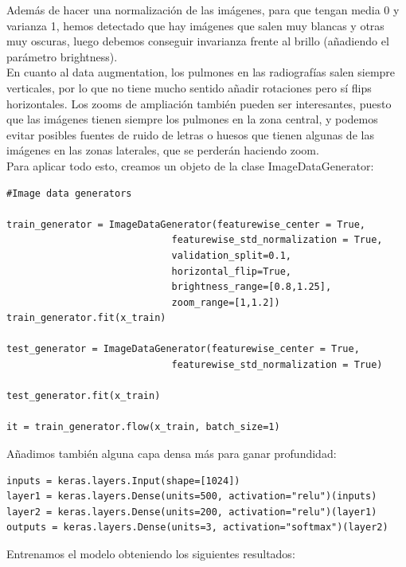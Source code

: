 \documentclass[11pt,a4paper]{article}
\theoremstyle{definition}
\begin{document}
Además de hacer una normalización de las imágenes, para que tengan media 0 y varianza 1, hemos detectado que hay imágenes que salen muy blancas y otras muy oscuras, luego debemos conseguir invarianza frente al brillo (añadiendo el parámetro brightness).\\

En cuanto al data augmentation, los pulmones en las radiografías salen siempre verticales, por lo que no tiene mucho sentido añadir rotaciones pero sí flips horizontales. Los zooms de ampliación también pueden ser interesantes, puesto que las imágenes tienen siempre los pulmones en la zona central, y podemos evitar posibles fuentes de ruido de letras o huesos que tienen algunas de las imágenes en las zonas laterales, que se perderán haciendo zoom.\\

Para aplicar todo esto, creamos un objeto de la clase ImageDataGenerator:

\begin{lstlisting}
#Image data generators

train_generator = ImageDataGenerator(featurewise_center = True,
                             featurewise_std_normalization = True,
                             validation_split=0.1,
                             horizontal_flip=True,
                             brightness_range=[0.8,1.25],
                             zoom_range=[1,1.2])
train_generator.fit(x_train)

test_generator = ImageDataGenerator(featurewise_center = True,
                             featurewise_std_normalization = True)

test_generator.fit(x_train)

it = train_generator.flow(x_train, batch_size=1)
\end{lstlisting}

Añadimos también alguna capa densa más para ganar profundidad:

\begin{lstlisting}
inputs = keras.layers.Input(shape=[1024])
layer1 = keras.layers.Dense(units=500, activation="relu")(inputs)
layer2 = keras.layers.Dense(units=200, activation="relu")(layer1)
outputs = keras.layers.Dense(units=3, activation="softmax")(layer2)
\end{lstlisting}

Entrenamos el modelo obteniendo los siguientes resultados:
\end{document}
